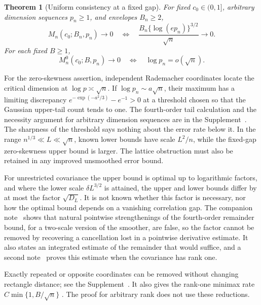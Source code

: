 \documentclass[11pt,letterpaper]{article}
\newif\ifshowpolish
\newcommand{\polish}[1]{\ifshowpolish{\color{magenta}%
\hypersetup{linkcolor=magenta,citecolor=magenta,urlcolor=magenta}#1}\else#1\fi}
\newif\ifshowrev
\newcommand{\rev}[1]{\ifshowrev{\color{revblue}%
\hypersetup{linkcolor=revblue,citecolor=revblue,urlcolor=revblue}#1}\else#1\fi}
\newif\ifshowrevnotes
\newcommand{\revnote}[1]{\ifshowrevnotes{\color{revblue}\footnotesize[#1]}\fi}
\newif\ifshownat
\newcommand{\nat}[1]{\ifshownat{\color{revblue}%
\hypersetup{linkcolor=revblue,citecolor=revblue,urlcolor=revblue}#1}\else#1\fi}
\newtheorem{theorem}{Theorem}
\theoremstyle{remark}
\begin{document}
\begin{theorem}[Uniform consistency at a fixed gap]
\label{opt:consistency}
For fixed \(c_0\in(0,1]\), arbitrary dimension sequences \(p_n\ge1\),
and envelopes \(B_n\ge2\),
\begin{equation}
 M_n(c_0;B_n,p_n)\longrightarrow0
 \quad\Longleftrightarrow\quad
 \frac{B_n\{\log(ep_n)\}^{3/2}}{\sqrt n}\longrightarrow0.
 \label{opt:consistency-iff}
\end{equation}
For each fixed \(B\ge1\),
\[
 M_n^0(c_0;B,p_n)\longrightarrow0
 \quad\Longleftrightarrow\quad \log p_n=o(\sqrt n).
\]
\end{theorem}

For the zero-skewness assertion, independent Rademacher coordinates
locate the critical dimension at
\(\log p\asymp\sqrt n\). If \(\log p_n\sim a\sqrt n\), their
maximum has a limiting discrepancy
\(e^{-\exp(-a^2/3)}-e^{-1}>0\) at a threshold chosen so that the
Gaussian upper-tail count tends to one. \polish{The fourth-order tail calculation and the necessity argument for
arbitrary dimension sequences are in the Supplement~\cite[Section~S.3,
Proposition~S.2 and the following proof]{Supplement}.} \rev{The sharpness of the
threshold says nothing about the error rate below it. In the range
\(n^{1/3}\ll L\ll\sqrt n\), known lower bounds have scale
\(L^2/n\), while the fixed-gap zero-skewness upper bound is larger.}
The lattice obstruction must also be retained in any improved
unsmoothed error bound.

\rev{For unrestricted covariance the upper bound is optimal up to
logarithmic factors, and where the lower scale \(\delta L^{3/2}\) is
attained, the upper and lower bounds differ by at most the factor
\(\sqrt{D_L}\). \nat{It is not known whether this factor is necessary, nor how}
the optimal bound depends on a vanishing correlation gap. The companion
note~\cite{Obstruction} shows that natural pointwise strengthenings of
the fourth-order remainder bound, for a two-scale version of the
smoother, are false, so the factor cannot be removed by recovering a
cancellation lost in a pointwise derivative estimate. It also states an
integrated estimate of the remainder that would suffice, and a second
note~\cite{IntegratedRemainder} proves this estimate when the covariance
has rank one.}
\revnote{Removed: the claim that a companion note removes the factor at
covariance rank at most two. That note is not available.}

\polish{Exactly repeated or opposite coordinates can be removed without
changing rectangle distance; see the Supplement~\cite[Section~S.5,
Proposition~S.6]{Supplement}. It also gives the rank-one minimax rate
\(C\min\{1,B/\sqrt n\}\) \cite[Section~S.4.3, Proposition~S.4]{Supplement}.
\rev{The proof for arbitrary rank does not use these reductions.}}
\end{document}
